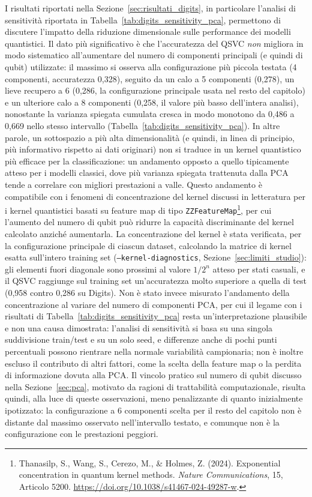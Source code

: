 I risultati riportati nella Sezione~\ref{sec:risultati_digits}, in particolare l'analisi di sensitività riportata in Tabella~\ref{tab:digits_sensitivity_pca}, permettono di discutere l'impatto della riduzione dimensionale sulle performance dei modelli quantistici. Il dato più significativo è che l'accuratezza del QSVC \emph{non} migliora in modo sistematico all'aumentare del numero di componenti principali (e quindi di qubit) utilizzate: il massimo si osserva alla configurazione più piccola testata (4 componenti, accuratezza 0,328), seguito da un calo a 5 componenti (0,278), un lieve recupero a 6 (0,286, la configurazione principale usata nel resto del capitolo) e un ulteriore calo a 8 componenti (0,258, il valore più basso dell'intera analisi), nonostante la varianza spiegata cumulata cresca in modo monotono da 0,486 a 0,669 nello stesso intervallo (Tabella~\ref{tab:digits_sensitivity_pca}). In altre parole, un sottospazio a più alta dimensionalità (e quindi, in linea di principio, più informativo rispetto ai dati originari) non si traduce in un kernel quantistico più efficace per la classificazione: un andamento opposto a quello tipicamente atteso per i modelli classici, dove più varianza spiegata trattenuta dalla PCA tende a correlare con migliori prestazioni a valle. Questo andamento è compatibile con i fenomeni di concentrazione del kernel discussi in letteratura per i kernel quantistici basati su feature map di tipo \texttt{ZZFeatureMap}\footnote{Thanasilp, S., Wang, S., Cerezo, M., \& Holmes, Z. (2024). Exponential concentration in quantum kernel methods. \textit{Nature Communications}, 15, Articolo 5200. \url{https://doi.org/10.1038/s41467-024-49287-w}.}, per cui l'aumento del numero di qubit può ridurre la capacità discriminante del kernel calcolato anziché aumentarla. La concentrazione del kernel è stata verificata, per la configurazione principale di ciascun dataset, calcolando la matrice di kernel esatta sull'intero training set (\texttt{--kernel-diagnostics}, Sezione~\ref{sec:limiti_studio}): gli elementi fuori diagonale sono prossimi al valore $1/2^n$ atteso per stati casuali, e il QSVC raggiunge sul training set un'accuratezza molto superiore a quella di test (0,958 contro 0,286 su Digits). Non è stato invece misurato l'andamento della concentrazione al variare del numero di componenti PCA, per cui il legame con i risultati di Tabella~\ref{tab:digits_sensitivity_pca} resta un'interpretazione plausibile e non una causa dimostrata: l'analisi di sensitività si basa su una singola suddivisione train/test e su un solo seed, e differenze anche di pochi punti percentuali possono rientrare nella normale variabilità campionaria; non è inoltre escluso il contributo di altri fattori, come la scelta della feature map o la perdita di informazione dovuta alla PCA. Il vincolo pratico sul numero di qubit discusso nella Sezione~\ref{sec:pca}, motivato da ragioni di trattabilità computazionale, risulta quindi, alla luce di queste osservazioni, meno penalizzante di quanto inizialmente ipotizzato: la configurazione a 6 componenti scelta per il resto del capitolo non è distante dal massimo osservato nell'intervallo testato, e comunque non è la configurazione con le prestazioni peggiori.

